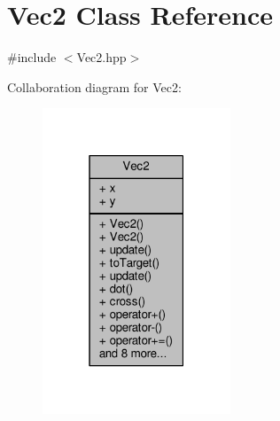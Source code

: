 \hypertarget{class_vec2}{}\section{Vec2 Class Reference}
\label{class_vec2}


{\ttfamily \#include $<$Vec2.\+hpp$>$}



Collaboration diagram for Vec2\+:\nopagebreak
\begin{figure}[H]
\begin{center}
\leavevmode
\includegraphics[width=159pt]{class_vec2__coll__graph}
\end{center}
\end{figure}
